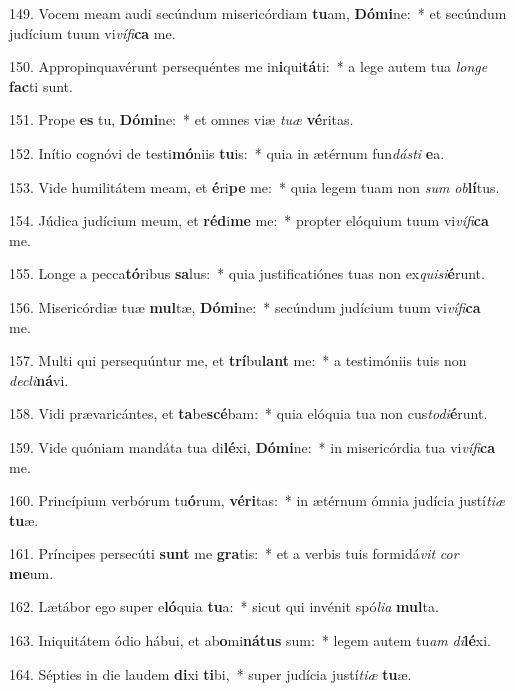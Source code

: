 149. Vocem meam audi secúndum misericórdiam \textbf{tu}am, \textbf{Dó}\textbf{mi}ne:~*  et secúndum judícium tuum vi\textit{ví}\textit{fi}\textbf{ca} me.\

150. Appropinquavérunt persequéntes me in\textbf{i}qui\textbf{tá}ti:~*  a lege autem tua \textit{lon}\textit{ge} \textbf{fac}ti sunt.\

151. Prope \textbf{es} tu, \textbf{Dó}\textbf{mi}ne:~*  et omnes viæ \textit{tu}\textit{æ} \textbf{vé}ritas.\

152. Inítio cognóvi de testi\textbf{mó}niis \textbf{tu}is:~*  quia in ætérnum fun\textit{dás}\textit{ti} \textbf{e}a.\

153. Vide humilitátem meam, et \textbf{é}ri\textbf{pe} me:~*  quia legem tuam non \textit{sum} \textit{ob}\textbf{lí}tus.\

154. Júdica judícium meum, et \textbf{réd}i\textbf{me} me:~*  propter elóquium tuum vi\textit{ví}\textit{fi}\textbf{ca} me.\

155. Longe a pecca\textbf{tó}ribus \textbf{sa}lus:~*  quia justificatiónes tuas non ex\textit{qui}\textit{si}\textbf{é}runt.\

156. Misericórdiæ tuæ \textbf{mul}tæ, \textbf{Dó}\textbf{mi}ne:~*  secúndum judícium tuum vi\textit{ví}\textit{fi}\textbf{ca} me.\

157. Multi qui persequúntur me, et \textbf{trí}bu\textbf{lant} me:~*  a testimóniis tuis non \textit{de}\textit{cli}\textbf{ná}vi.\

158. Vidi prævaricántes, et \textbf{ta}be\textbf{scé}bam:~*  quia elóquia tua non cus\textit{to}\textit{di}\textbf{é}runt.\

159. Vide quóniam mandáta tua di\textbf{lé}xi, \textbf{Dó}\textbf{mi}ne:~*  in misericórdia tua vi\textit{ví}\textit{fi}\textbf{ca} me.\

160. Princípium verbórum tu\textbf{ó}rum, \textbf{vé}\textbf{ri}tas:~*  in ætérnum ómnia judícia justí\textit{ti}\textit{æ} \textbf{tu}æ.\

161. Príncipes persecúti \textbf{sunt} me \textbf{gra}tis:~*  et a verbis tuis formidá\textit{vit} \textit{cor} \textbf{me}um.\

162. Lætábor ego super e\textbf{ló}quia \textbf{tu}a:~*  sicut qui invénit spó\textit{li}\textit{a} \textbf{mul}ta.\

163. Iniquitátem ódio hábui, et ab\textbf{o}mi\textbf{ná}\textbf{tus} sum:~*  legem autem tu\textit{am} \textit{di}\textbf{lé}xi.\

164. Sépties in die laudem \textbf{di}xi \textbf{ti}bi,~*  super judícia justí\textit{ti}\textit{æ} \textbf{tu}æ.\

